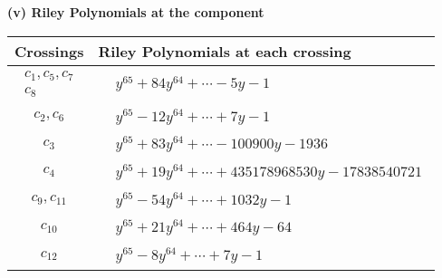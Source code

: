 \documentclass[1p]{elsarticle_modified}
\theoremstyle{definition}
\begin{document}
\newpage\renewcommand{\arraystretch}{1}
\flushleft \textbf{(v) Riley Polynomials at the component}\newline \\
\begin{tabular}{m{50pt}|m{274pt}}
Crossings & \hspace{64pt}Riley Polynomials at each crossing \\
\hline $$\begin{aligned}c_{1},c_{5},c_{7}\\c_{8}\end{aligned}$$&$\begin{aligned}
&y^{65}+84 y^{64}+\cdots-5 y-1
\end{aligned}$\\
\hline $$\begin{aligned}c_{2},c_{6}\end{aligned}$$&$\begin{aligned}
&y^{65}-12 y^{64}+\cdots+7 y-1
\end{aligned}$\\
\hline $$\begin{aligned}c_{3}\end{aligned}$$&$\begin{aligned}
&y^{65}+83 y^{64}+\cdots-100900 y-1936
\end{aligned}$\\
\hline $$\begin{aligned}c_{4}\end{aligned}$$&$\begin{aligned}
&y^{65}+19 y^{64}+\cdots+435178968530 y-17838540721
\end{aligned}$\\
\hline $$\begin{aligned}c_{9},c_{11}\end{aligned}$$&$\begin{aligned}
&y^{65}-54 y^{64}+\cdots+1032 y-1
\end{aligned}$\\
\hline $$\begin{aligned}c_{10}\end{aligned}$$&$\begin{aligned}
&y^{65}+21 y^{64}+\cdots+464 y-64
\end{aligned}$\\
\hline $$\begin{aligned}c_{12}\end{aligned}$$&$\begin{aligned}
&y^{65}-8 y^{64}+\cdots+7 y-1
\end{aligned}$\\
\hline
\end{tabular}\\~\\
\end{document}
